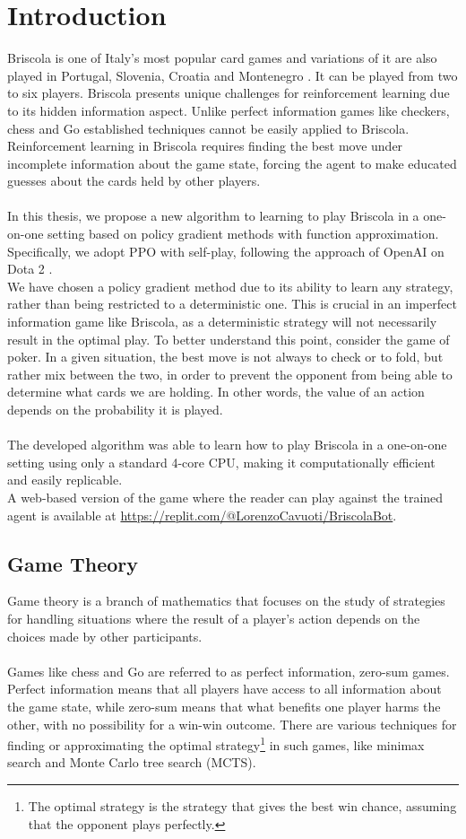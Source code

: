 \chapter{Introduction}
Briscola is one of Italy's most popular card games and variations of it are also played in Portugal, Slovenia, Croatia and Montenegro \cite{briscola-wikipedia}. It can be played from two to six players. Briscola presents unique challenges for reinforcement learning due to its hidden information aspect. Unlike perfect information games like checkers, chess and Go established techniques cannot be easily applied to Briscola. Reinforcement learning in Briscola requires finding the best move under incomplete information about the game state, forcing the agent to make educated guesses about the cards held by other players.\\\\
In this thesis, we propose a new algorithm to learning to play Briscola in a one-on-one setting based on policy gradient methods with function approximation. Specifically, we adopt PPO with self-play, following the approach of OpenAI on Dota 2 \cite{open-ai-five}.\\
We have chosen a policy gradient method due to its ability to learn any strategy, rather than being restricted to a deterministic one. This is crucial in an imperfect information game like Briscola, as a deterministic strategy will not necessarily result in the optimal play. To better understand this point, consider the game of poker. In a given situation, the best move is not always to check or to fold, but rather mix between the two, in order to prevent the opponent from being able to determine what cards we are holding. In other words, the value
of an action depends on the probability it is played.\\\\
The developed algorithm was able to learn how to play Briscola in a one-on-one setting using only a standard 4-core CPU, making it computationally efficient and easily replicable.\\
A web-based version of the game where the reader can play against the trained agent is available at \url{https://replit.com/@LorenzoCavuoti/BriscolaBot}.

\section{Game Theory}
Game theory is a branch of mathematics that focuses on the study of strategies for handling situations where the result of a player's action depends on the choices made by other participants.\\\\
Games like chess and Go are referred to as perfect information, zero-sum games. Perfect information means that all players have access to all information about the game state, while zero-sum means that what benefits one player harms the other, with no possibility for a win-win outcome. There are various techniques for finding or approximating the optimal strategy\footnote{The optimal strategy is the strategy that gives the best win chance, assuming that the opponent plays perfectly.} in such games, like minimax search and Monte Carlo tree search (MCTS).

